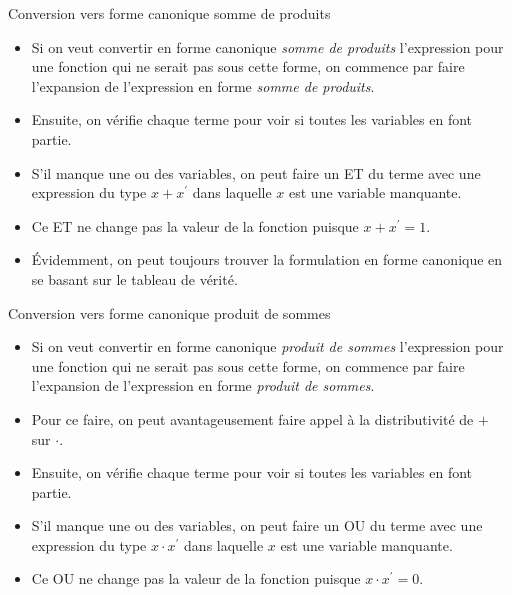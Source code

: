 \documentclass[presentation]{beamer}
\begin{document}
\begin{frame}[label={sec:org0db6436}]{Conversion vers forme canonique somme de produits}
\begin{itemize}
\item Si on veut convertir en forme canonique \emph{somme de produits} l'expression pour une fonction qui ne serait pas sous cette forme, on commence par faire l'expansion de l'expression en forme \emph{somme de produits}.

\item Ensuite, on vérifie chaque terme pour voir si toutes les variables en font partie.

\item S'il manque une ou des variables, on peut faire un ET du terme avec une expression du type \(x + x^\prime\) dans laquelle \(x\) est une variable manquante.

\item Ce ET ne change pas la valeur de la fonction puisque \(x + x^\prime = 1\).

\item Évidemment, on peut toujours trouver la formulation en forme canonique en se basant sur le tableau de vérité.
\end{itemize}
\end{frame}

\begin{frame}[label={sec:org31e8099}]{Conversion vers forme canonique produit de sommes}
\begin{itemize}
\item Si on veut convertir en forme canonique \emph{produit de sommes} l'expression pour une fonction qui ne serait pas sous cette forme, on commence par faire l'expansion de l'expression en forme \emph{produit de sommes}.

\item Pour ce faire, on peut avantageusement faire appel à la distributivité de \(+\) sur \(\cdot\).

\item Ensuite, on vérifie chaque terme pour voir si toutes les variables en font partie.

\item S'il manque une ou des variables, on peut faire un OU du terme avec une expression du type \(x \cdot x^\prime\) dans laquelle \(x\) est une variable manquante.

\item Ce OU ne change pas la valeur de la fonction puisque \(x \cdot x^\prime = 0\).
\end{itemize}
\end{frame}
\end{document}
